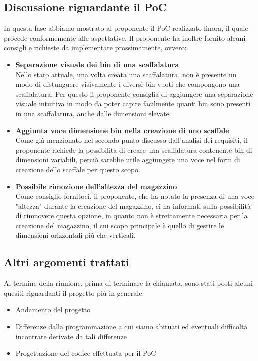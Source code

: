 \subsection{Discussione riguardante il PoC} \label{sec:argomenti:discussione_poc}
    In questa fase abbiamo mostrato al proponente il PoC realizzato finora, il quale procede conformemente alle aspettative. Il proponente ha inoltre fornito alcuni consigli e richieste da implementare prossimamente, ovvero:
    \begin{itemize}
        \item \textbf{Separazione visuale dei bin di una scaffalatura}\\
        Nello stato attuale, una volta creata una scaffalatura, non è presente un modo di distunguere visivamente i diversi bin vuoti che compongono una scaffalatura. Per questo il proponente consiglia di aggiungere una separazione visuale intuitiva in modo da poter capire facilmente quanti bin sono presenti in una scaffalatura, anche dalle dimensioni elevate. \\
        \item \textbf{Aggiunta voce dimensione bin nella creazione di uno scaffale}\\
        Come già menzionato nel secondo punto discusso dall'analisi dei requisiti, il proponente richiede la possibilità di creare una scaffalatura contenente bin di dimensioni variabili, perciò sarebbe utile aggiungere una voce nel form di creazione dello scaffale per questo scopo.
        \item \textbf{Possibile rimozione dell'altezza del magazzino}\\
        Come consiglio fornitoci, il proponente, che ha notato la presenza di una voce "altezza" durante la creazione del magazzino, ci ha informati sulla possibilità di rimuovere questa opzione, in quanto non è strettamente necessaria per la creazione del magazzino, il cui scopo principale è quello di gestire le dimensioni orizzontali più che verticali.
    \end{itemize}

\subsection{Altri argomenti trattati} \label{sec:argomenti:altri}
    Al termine della riunione, prima di terminare la chiamata, sono stati posti alcuni quesiti riguardanti il progetto più in generale:
    \begin{itemize}
        \item Andamento del progetto \\
        
        \item Differenze dalla programmazione a cui siamo abituati ed eventuali difficoltà incontrate derivate da tali differenze\\
        
        \item Progettazione del codice effettuata per il PoC \\
    \end{itemize}